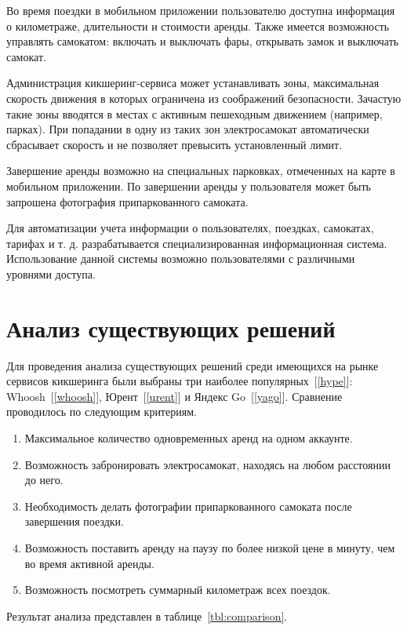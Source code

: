 Во время поездки в мобильном приложении пользователю доступна информация о километраже, длительности и стоимости аренды. Также имеется возможность управлять самокатом: включать и выключать фары, открывать замок и выключать самокат.

Администрация кикшеринг-сервиса может устанавливать зоны, максимальная скорость движения в которых ограничена из соображений безопасности. Зачастую такие зоны вводятся в местах с активным пешеходным движением (например, парках). При попадании в одну из таких зон электросамокат автоматически сбрасывает скорость и не позволяет превысить установленный лимит.

Завершение аренды возможно на специальных парковках, отмеченных на карте в мобильном приложении. По завершении аренды у пользователя может быть запрошена фотография припаркованного самоката.

Для автоматизации учета информации о пользователях, поездках, самокатах, тарифах и т. д. разрабатывается специализированная информационная система. Использование данной системы возможно пользователями с различными уровнями доступа.

\section{Анализ существующих решений}

Для проведения анализа существующих решений среди имеющихся на рынке сервисов кикшеринга были выбраны три наиболее популярных~[\ref{hype}]: Whoosh~[\ref{whoosh}], Юрент~[\ref{urent}] и Яндекс Go~[\ref{yago}]. Сравнение проводилось по следующим критериям.

\begin{enumerate}
	\item Максимальное количество одновременных аренд на одном аккаунте.
	\item Возможность забронировать электросамокат, находясь на любом расстоянии до него.
	\item Необходимость делать фотографии припаркованного самоката после завершения поездки.
	\item Возможность поставить аренду на паузу по более низкой цене в минуту, чем во время активной аренды.
	\item Возможность посмотреть суммарный километраж всех поездок.
\end{enumerate}

Результат анализа представлен в таблице~\ref{tbl:comparison}.

